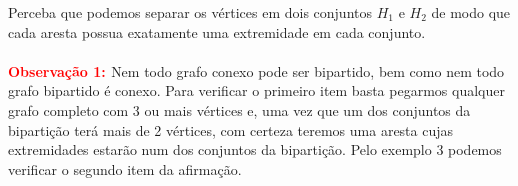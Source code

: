 \documentclass[a4paper,12pt]{article}
\begin{document}
	\vspace{0.5cm}
	Perceba que podemos separar os vértices em dois conjuntos $H_1$ e $H_2$ de modo que cada aresta possua exatamente uma extremidade em cada conjunto.
	\\
	\\
	\textbf{\textcolor{Red}{Observação 1: }}Nem todo grafo conexo pode ser bipartido, bem como nem todo grafo bipartido é conexo. Para verificar o primeiro item basta pegarmos qualquer grafo completo com 3 ou mais vértices e, uma vez que um dos conjuntos da bipartição terá mais de 2 vértices, com certeza teremos uma aresta cujas extremidades estarão num dos conjuntos da bipartição. Pelo exemplo 3 podemos verificar o segundo item da afirmação. 
\end{document}
